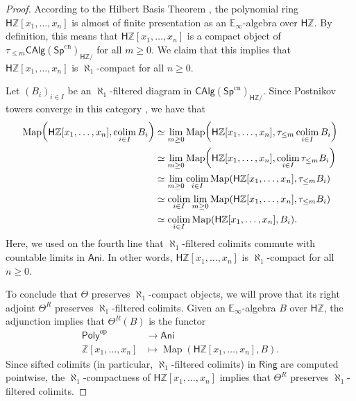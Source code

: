 \begin{proof}
    According to the Hilbert Basis Theorem \cite[Prop.~7.2.4.31]{higheralgebra}, the polynomial ring $\mathsf{H}\mathbb{Z}[x_1,\dots,x_n]$ is almost of finite presentation as an $\mathbb{E}_\infty$-algebra over $\mathsf{H}\mathbb{Z}$. By definition, this means that $\mathsf{H}\mathbb{Z}[x_1,\dots,x_n]$ is a compact object of $\tau_{\leq m}\mathsf{CAlg}(\mathsf{Sp}^\mathrm{cn})_{\mathsf{H}\mathbb{Z}/}$ for all $m\geq 0$. We claim that this implies that $\mathsf{H}\mathbb{Z}[x_1,\dots,x_n]$ is $\aleph_1$-compact for all $n\geq 0$.

    Let $(B_i)_{i\in I}$ be an $\aleph_1$-filtered diagram in $\mathsf{CAlg}(\mathsf{Sp}^\mathrm{cn})_{\mathsf{H}\mathbb{Z}/}$. Since Postnikov towers converge in this category \cite[Prop.~7.1.3.19]{higheralgebra}, we have that
    \begin{align*}
        \operatorname{Map}\mleft(\mathsf{H}\mathbb{Z}[x_1,\dots,x_n],\operatornamewithlimits{colim}_{i\in I}B_i\mright) &\simeq \lim_{m\geq 0}\operatorname{Map}\mleft(\mathsf{H}\mathbb{Z}[x_1,\dots,x_n],\tau_{\leq m}\operatornamewithlimits{colim}_{i\in I}B_i\mright) \\
        &\simeq \lim_{m\geq 0}\operatorname{Map}\mleft(\mathsf{H}\mathbb{Z}[x_1,\dots,x_n],\operatornamewithlimits{colim}_{i\in I}\tau_{\leq m}B_i\mright) \\
        &\simeq \lim_{m\geq 0}\operatornamewithlimits{colim}_{i\in I}\operatorname{Map}(\mathsf{H}\mathbb{Z}[x_1,\dots,x_n],\tau_{\leq m}B_i) \\
        &\simeq \operatornamewithlimits{colim}_{i\in I}\lim_{m\geq 0}\operatorname{Map}(\mathsf{H}\mathbb{Z}[x_1,\dots,x_n],\tau_{\leq m}B_i) \\
        &\simeq \operatornamewithlimits{colim}_{i\in I}\operatorname{Map}(\mathsf{H}\mathbb{Z}[x_1,\dots,x_n],B_i).
    \end{align*}
    Here, we used on the fourth line that $\aleph_1$-filtered colimits commute with countable limits in $\mathsf{Ani}$. In other words, $\mathsf{H}\mathbb{Z}[x_1,\dots,x_n]$ is $\aleph_1$-compact for all $n\geq 0$.

    To conclude that $\Theta$ preserves $\aleph_1$-compact objects, we will prove that its right adjoint $\Theta^R$ preserves $\aleph_1$-filtered colimits. Given an $\mathbb{E}_\infty$-algebra $B$ over $\mathsf{H}\mathbb{Z}$, the adjunction implies that $\Theta^R(B)$ is the functor
    \begin{align*}
        \mathsf{Poly}^\mathrm{op} &\to \mathsf{Ani}\\
        \mathbb{Z}[x_1,\dots,x_n] &\mapsto \operatorname{Map}(\mathsf{H}\mathbb{Z}[x_1,\dots,x_n],B).
    \end{align*}
    Since sifted colimits (in particular, $\aleph_1$-filtered colimits) in $\mathsf{Ring}$ are computed pointwise, the $\aleph_1$-compactness of $\mathsf{H}\mathbb{Z}[x_1,\dots,x_n]$ implies that $\Theta^R$ preserves $\aleph_1$-filtered colimits.
\end{proof}

